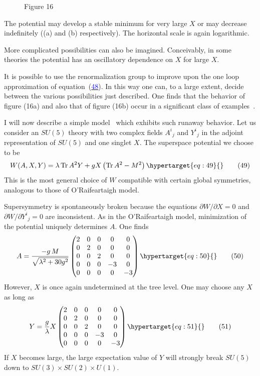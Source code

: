 \documentclass[11pt,a4paper]{article}
\newcommand{\eqtarget}[1]{\hypertarget{eq:#1}{\mathstrut}\tag{#1}}
\newcommand{\eqnref}[1]{(\hyperlink{eq:#1}{\textcolor{blue}{#1}})}
\begin{document}
\begin{figure}[h]
\centering

\par\smallskip
Figure 16
\end{figure}

The potential may develop a stable minimum for very large $X$ or may
decrease indefinitely ((a) and (b) respectively). The horizontal
scale is again logarithmic.

More complicated possibilities can also be imagined. Conceivably,
in some theories the potential has an oscillatory dependence
on $X$ for large $X$.

It is possible to use the renormalization group to improve upon
the one loop approximation of equation~\eqnref{48}. In this way one can,
to a large extent, decide between the various possibilities just
described. One finds that the behavior of figure (16a) and also
that of figure (16b) occur in a significant class of examples~\cite{ref17}.

I will now describe a simple model~\cite{ref14} which exhibits such runaway
behavior. Let us consider an $SU(5)$ theory with two complex
fields $A^i{}_j$ and $Y^i{}_j$ in the adjoint representation of $SU(5)$ and one
singlet $X$. The superspace potential we choose to be
\begin{equation}
W(A,X,Y) = \lambda \,\mathrm{Tr}\, A^2Y + gX \left(\mathrm{Tr}\, A^2 - M^2\right)
\eqtarget{49}
\end{equation}
This is the most general choice of $W$ compatible with certain global
symmetries, analogous to those of O'Raifeartaigh model.

Supersymmetry is spontaneously broken because the equations
$\partial W/\partial X = 0$ and $\partial W/\partial Y^i{}_j = 0$ are inconsistent. As in the O'Raifeartaigh
model, minimization of the potential uniquely determines $A$. One
finds
\begin{equation}
A = \frac{-g\, M}{\sqrt{\lambda^2 + 30g^2}}
\begin{pmatrix}
2 & 0 & 0 & 0 & 0 \\
0 & 2 & 0 & 0 & 0 \\
0 & 0 & 2 & 0 & 0 \\
0 & 0 & 0 & -3 & 0 \\
0 & 0 & 0 & 0 & -3
\end{pmatrix}
\eqtarget{50}
\end{equation}
However, $X$ is once again undetermined at the tree level. One may
choose any $X$ as long as
\begin{equation}
Y = \frac{g}{\lambda} X
\begin{pmatrix}
2 & 0 & 0 & 0 & 0 \\
0 & 2 & 0 & 0 & 0 \\
0 & 0 & 2 & 0 & 0 \\
0 & 0 & 0 & -3 & 0 \\
0 & 0 & 0 & 0 & -3
\end{pmatrix}
\eqtarget{51}
\end{equation}
If $X$ becomes large, the large expectation value of $Y$ will strongly
break $SU(5)$ down to $SU(3) \times SU(2) \times U(1)$.
\end{document}
